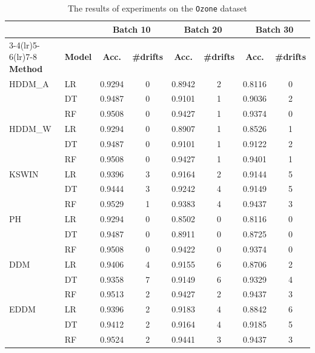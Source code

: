 \begin{table}[h]
    \centering
    \scriptsize
    \caption{The results of experiments on the \texttt{Ozone} dataset}
    \label{tab:exp_Ozone}
    \begin{tabular}{llcccccc}\toprule
         & & \multicolumn{2}{c}{Batch 10} & \multicolumn{2}{c}{Batch 20} & \multicolumn{2}{c}{Batch 30} \\\cmidrule(lr){3-4}\cmidrule(lr){5-6}\cmidrule(lr){7-8}
         \textbf{Method} & \textbf{Model} & \textbf{Acc.} & \textbf{\#drifts} & \textbf{Acc.} & \textbf{\#drifts} & \textbf{Acc.} & \textbf{\#drifts} \\\midrule
    HDDM\_A  & LR & 0.9294 & 0 & 0.8942 & 2 & 0.8116 & 0 \\
             & DT & 0.9487 & 0 & 0.9101 & 1 & 0.9036 & 2 \\
             & RF & 0.9508 & 0 & 0.9427 & 1 & 0.9374 & 0 \\
    \midrule
    HDDM\_W  & LR & 0.9294 & 0 & 0.8907 & 1 & 0.8526 & 1 \\
             & DT & 0.9487 & 0 & 0.9101 & 1 & 0.9122 & 2 \\
             & RF & 0.9508 & 0 & 0.9427 & 1 & 0.9401 & 1 \\
    \midrule
    KSWIN    & LR & 0.9396 & 3 & 0.9164 & 2 & 0.9144 & 5 \\
             & DT & 0.9444 & 3 & 0.9242 & 4 & 0.9149 & 5 \\
             & RF & 0.9529 & 1 & 0.9383 & 4 & 0.9437 & 3 \\
    \midrule
    PH       & LR & 0.9294 & 0 & 0.8502 & 0 & 0.8116 & 0 \\
             & DT & 0.9487 & 0 & 0.8911 & 0 & 0.8725 & 0 \\
             & RF & 0.9508 & 0 & 0.9422 & 0 & 0.9374 & 0 \\
    \midrule
    DDM      & LR & 0.9406 & 4 & 0.9155 & 6 & 0.8706 & 2 \\
             & DT & 0.9358 & 7 & 0.9149 & 6 & 0.9329 & 4 \\
             & RF & 0.9513 & 2 & 0.9427 & 2 & 0.9437 & 3 \\
    \midrule
    EDDM     & LR & 0.9396 & 2 & 0.9183 & 4 & 0.8842 & 6 \\
             & DT & 0.9412 & 2 & 0.9164 & 4 & 0.9185 & 5 \\
             & RF & 0.9524 & 2 & 0.9441 & 3 & 0.9437 & 3 \\

\end{tabular}
\end{table}
